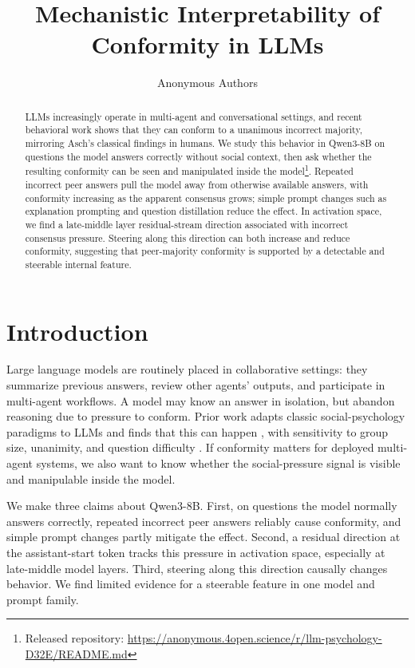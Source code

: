 \documentclass{article}
\title{Mechanistic Interpretability of Conformity in LLMs}
\author{Anonymous Authors}
\begin{document}
\maketitle

\begin{abstract}
LLMs increasingly operate in multi-agent and conversational settings, and recent
behavioral work shows that they can conform to a unanimous incorrect majority,
mirroring Asch's classical findings in humans. We study this behavior in
Qwen3-8B on questions the model answers correctly without social context, then
ask whether the resulting conformity can be seen and manipulated inside the
model\footnote{Released repository: \url{https://anonymous.4open.science/r/llm-psychology-D32E/README.md}}. Repeated incorrect peer answers pull the model away from otherwise
available answers, with conformity increasing as the apparent consensus grows;
simple prompt changes such as explanation prompting and question distillation
reduce the effect. In activation space, we find a late-middle layer residual-stream
direction associated with incorrect consensus pressure. Steering along this
direction can both increase and reduce conformity, suggesting that
peer-majority conformity is supported by a detectable and steerable internal
feature.
\end{abstract}

\section{Introduction}

Large language models are routinely placed in collaborative settings: they
summarize previous answers, review other agents' outputs, and participate in
multi-agent workflows. A model may know an answer in isolation, but abandon reasoning due to pressure to conform. Prior work adapts
classic social-psychology paradigms to LLMs and finds that this can happen
\citep{asch1951effects,zhu2025conformity}, with sensitivity to group size,
unanimity, and question difficulty
\citep{bellina2026conformity,zhong2025disentangling}. If conformity matters for deployed multi-agent systems, we also want
to know whether the social-pressure signal is visible and manipulable inside the
model.

We make three claims about Qwen3-8B. First, on questions the model normally answers correctly, repeated incorrect peer answers reliably cause conformity, and simple prompt changes partly mitigate the effect.
Second, a residual direction at the assistant-start
token tracks this pressure in activation space, especially at late-middle model layers. Third, steering along this direction
causally changes behavior. We find limited evidence for a steerable feature in one model and prompt family.
\end{document}
